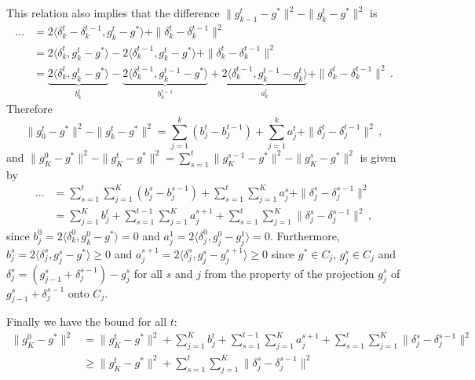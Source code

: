\documentclass[a4paper]{article}
\begin{document}
This relation also implies that the difference $\|g^t_{k-1} - g^*\|^2 - \|g^t_k - g^*\|^2$ is
\begin{align*}
  \ldots
    &= 2 \langle \delta^t_k - \delta^{t-1}_k, g^t_k - g^* \rangle
      + \| \delta^t_k - \delta^{t-1}_k \|^2
    \\
    &= 2 \langle \delta^t_k, g^t_k - g^* \rangle
      - 2 \langle \delta^{t-1}_k, g^t_k - g^* \rangle
      + \| \delta^t_k - \delta^{t-1}_k \|^2
    \\
    &= \underbrace{2 \langle \delta^t_k, g^t_k - g^* \rangle}_{b^t_k}
      - \underbrace{2 \langle \delta^{t-1}_k, g^{t-1}_k - g^* \rangle}_{b^{t-1}_k}
      + \underbrace{2 \langle \delta^{t-1}_k, g^{t-1}_k - g^t_k\rangle}_{a^t_k}
      + \| \delta^t_k - \delta^{t-1}_k \|^2
    \,.
\end{align*}
Therefore
\begin{equation*}
  \|g^t_0 - g^*\|^2 - \|g^t_k - g^*\|^2
    = \sum_{j=1}^k (b^t_j - b^{t-1}_j)
      + \sum_{j=1}^k a^t_j + \| \delta^t_j - \delta^{t-1}_j \|^2
    \,,
\end{equation*}
and $\|g^0_K - g^*\|^2 - \|g^t_K - g^*\|^2 = \sum_{s=1}^t \|g^{s-1}_K - g^*\|^2 - \|g^s_K - g^*\|^2$
is given by
\begin{align*}
  \dots
    &= \sum_{s=1}^t \sum_{j=1}^K (b^s_j - b^{s-1}_j)
      + \sum_{s=1}^t \sum_{j=1}^K a^s_j + \| \delta^s_j - \delta^{s-1}_j \|^2
      \\
    &= \sum_{j=1}^K b^t_j
      + \sum_{s=1}^{t-1} \sum_{j=1}^K a^{s+1}_j
      + \sum_{s=1}^t \sum_{j=1}^K \| \delta^s_j - \delta^{s-1}_j \|^2
    \,,
\end{align*}
since $b^0_j = 2 \langle \delta^0_k, g^0_k - g^* \rangle = 0$ and $a^1_j = 2 \langle
\delta^0_j, g^0_j - g^1_j\rangle = 0$. Furthermore, $b^s_j = 2 \langle \delta^s_j,
g^s_j - g^* \rangle \geq 0$ and $a^{s+1}_j = 2 \langle \delta^s_j, g^s_j - g^{s+1}_j\rangle
\geq 0$ since $g^*\in C_j$, $g^s_j \in C_j$ and $\delta^s_j = (g^s_{j-1} + \delta^{s-1}_j)
- g^s_j$ for all $s$ and $j$ from the property of the projection $g^s_j$ of $g^s_{j-1}
+ \delta^{s-1}_j$ onto $C_j$.

Finally we have the bound for all $t$:
\begin{align*}
  \|g^0_K - g^*\|^2
    &= \|g^t_K - g^*\|^2
      + \sum_{j=1}^K b^t_j
      + \sum_{s=1}^{t-1} \sum_{j=1}^K a^{s+1}_j
      + \sum_{s=1}^t \sum_{j=1}^K \| \delta^s_j - \delta^{s-1}_j \|^2
      \\
    &\geq \|g^t_K - g^*\|^2
      + \sum_{s=1}^t \sum_{j=1}^K \| \delta^s_j - \delta^{s-1}_j \|^2
      \\
\end{align*}
\end{document}
